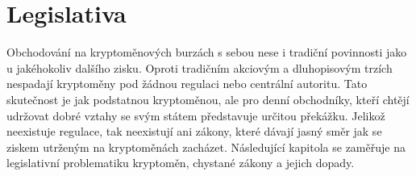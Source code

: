\chapter{Legislativa}
\label{sec:Legislation}
Obchodování na kryptoměnových burzách s sebou nese i tradiční povinnosti jako u jakéhokoliv dalšího zisku. Oproti tradičním akciovým a dluhopisovým trzích nespadají kryptoměny pod žádnou
regulaci nebo centrální autoritu. Tato skutečnost je jak podstatnou kryptoměnou, ale pro denní obchodníky, kteří chtějí udržovat dobré vztahy se svým státem představuje určitou překážku.
Jelikož neexistuje regulace, tak neexistují ani zákony, které dávají jasný směr jak se ziskem utrženým na kryptoměnách zacházet. Následující kapitola se zaměřuje na legislativní problematiku
kryptoměn, chystané zákony a jejich dopady.

\endinput